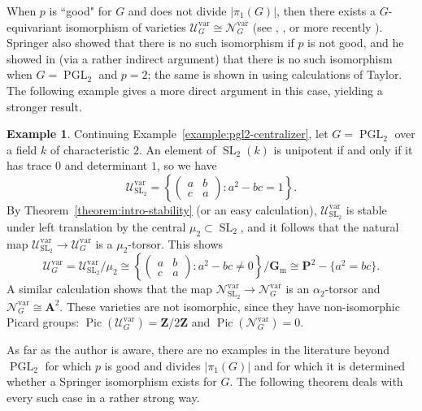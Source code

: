 \documentclass[11pt,reqno]{amsart}
\theoremstyle{definition}
\newtheorem{example}[theorem]{Example}
\renewcommand{\rm}{\mathrm}
\newcommand{\bA}{{\mathbf A}}
\newcommand{\bG}{{\mathbf G}}
\newcommand{\bP}{{\mathbf P}}
\newcommand{\bZ}{{\mathbf Z}}
\newcommand{\sN}{{\mathscr N}}
\newcommand{\sU}{{\mathscr U}}
\newcommand{\bGm}{\bG_{\rm{m}}}
\DeclareMathOperator{\Pic}{Pic}
\DeclareMathOperator{\PGL}{PGL}
\DeclareMathOperator{\SL}{SL}
\begin{document}
When $p$ is ``good" for $G$ and does not divide $|\pi_1(G)|$, then there exists a $G$-equivariant isomorphism of varieties $\sU_G^{\rm{var}} \cong \sN_G^{\rm{var}}$ (see \cite{Springer-isomorphism}, \cite{Bardsley-Richardson}, or more recently \cite[Theorem 1.1]{Integral-Springer}). Springer also showed that there is no such isomorphism if $p$ is not good, and he showed in \cite[Remark 3.8]{Springer-isomorphism} (via a rather indirect argument) that there is no such isomorphism when $G = \PGL_2$ and $p = 2$; the same is shown in \cite[Corollary 7.0.3]{Sobaje-unip} using calculations of Taylor. The following example gives a more direct argument in this case, yielding a stronger result.

\begin{example}\label{example:pgl2}
Continuing Example~\ref{example:pgl2-centralizer}, let $G = \PGL_2$ over a field $k$ of characteristic $2$. An element of $\SL_2(k)$ is unipotent if and only if it has trace $0$ and determinant $1$, so we have
\[
\sU_{\SL_2}^{\rm{var}} = \left\{\begin{pmatrix} a & b \\ c & a \end{pmatrix}: a^2 - bc = 1 \right\}.
\]
By Theorem~\ref{theorem:intro-stability} (or an easy calculation), $\sU_{\SL_2}^{\rm{var}}$ is stable under left translation by the central $\mu_2 \subset \SL_2$, and it follows that the natural map $\sU_{\SL_2}^{\rm{var}} \to \sU_G^{\rm{var}}$ is a $\mu_2$-torsor. This shows
\[
\sU_G^{\rm{var}} = \sU_{\SL_2}^{\rm{var}}/\mu_2 \cong \left\{\begin{pmatrix} a & b \\ c & a \end{pmatrix}: a^2 - bc \neq 0 \right\}/\bGm \cong \bP^2 - \{a^2 = bc\}.
\]
A similar calculation shows that the map $\sN_{\SL_2}^{\rm{var}} \to \sN_G^{\rm{var}}$ is an $\alpha_2$-torsor and $\sN_G^{\rm{var}} \cong \bA^2$. These varieties are not isomorphic, since they have non-isomorphic Picard groups: $\Pic(\sU_G^{\rm{var}}) = \bZ/2\bZ$ and $\Pic(\sN_G^{\rm{var}}) = 0$.
\end{example}

As far as the author is aware, there are no examples in the literature beyond $\PGL_2$ for which $p$ is good and divides $|\pi_1(G)|$ and for which it is determined whether a Springer isomorphism exists for $G$. The following theorem deals with every such case in a rather strong way.
\end{document}
